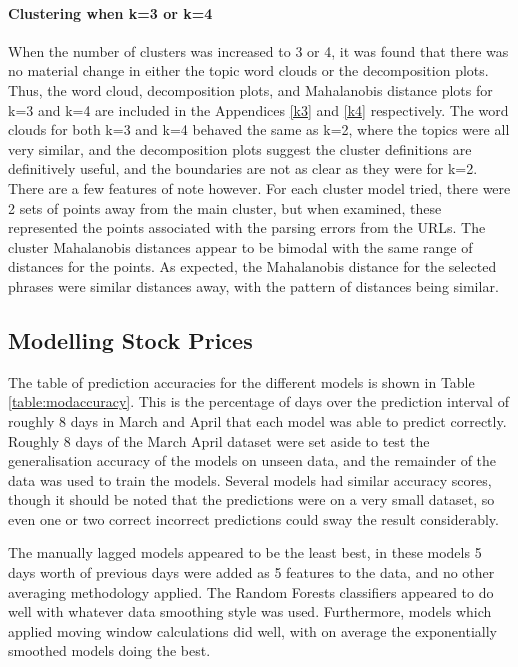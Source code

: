 \paragraph{Clustering when k=3 or k=4} 
When the number of clusters was increased to 3 or 4, it was found that there was no material change in either the topic word clouds or the decomposition plots. Thus, the word cloud, decomposition plots, and Mahalanobis distance plots for k=3 and k=4 are included in the Appendices \ref{k3} and \ref{k4} respectively. The word clouds for both k=3 and k=4 behaved the same as k=2, where the topics were all very similar, and the decomposition plots suggest the cluster definitions are definitively useful, and the boundaries are not as clear as they were for k=2.  There are a few features of note however. For each cluster model tried, there were 2 sets of points away from the main cluster, but when examined, these represented the points associated with the parsing errors from the URLs. The cluster Mahalanobis distances appear to be bimodal with the same range of distances for the points. As expected, the Mahalanobis distance for the selected phrases were similar distances away, with the pattern of distances being similar.

\subsection{Modelling Stock Prices}
The table of prediction accuracies for the different models is shown in Table \ref{table:modaccuracy}. This is the percentage of days over the prediction interval of roughly 8 days in March and April that each model was able to predict correctly. Roughly 8 days of the March April dataset were set aside to test the generalisation accuracy of the models on unseen data, and the remainder of the data was used to train the models. Several models had similar accuracy scores, though it should be noted that the predictions were on a very small dataset, so even one or two correct incorrect predictions could sway the result considerably. 

The manually lagged models appeared to be the least best, in these models 5 days worth of previous days were added as 5 features to the data, and no other averaging methodology applied. The Random Forests classifiers appeared to do well with whatever data smoothing style was used. Furthermore, models which applied moving window calculations did well, with on average the exponentially smoothed models doing the best.

